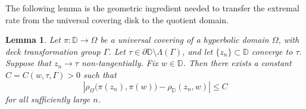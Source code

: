 \documentclass[10pt,a4paper]{amsart}
\numberwithin{equation}{section}
\newtheorem{lemma}[equation]{Lemma}
\begin{document}
The following lemma is the geometric ingredient needed to transfer the
extremal rate from the universal covering disk to the quotient domain.

\begin{lemma}
\label{lem:covering_distance}
Let $\pi:\mathbb D\to\Omega$ be a universal covering of a hyperbolic
domain $\Omega$, with deck transformation group $\Gamma$. Let
$\tau\in\partial\mathbb D\setminus\Lambda(\Gamma)$, and let
$\{z_n\}\subset\mathbb D$ converge to $\tau$. Suppose that
$z_n\to\tau$ non-tangentially. Fix $w\in\mathbb D$. Then there exists a
constant $C=C(w,\tau,\Gamma)>0$ such that
\begin{equation}
\label{eq:covering_distance_comparison}
\left|
\rho_\Omega\bigl(\pi(z_n),\pi(w)\bigr)
-
\rho_{\mathbb D}(z_n,w)
\right|
\le C
\end{equation}
for all sufficiently large $n$.
\end{lemma}
\end{document}
